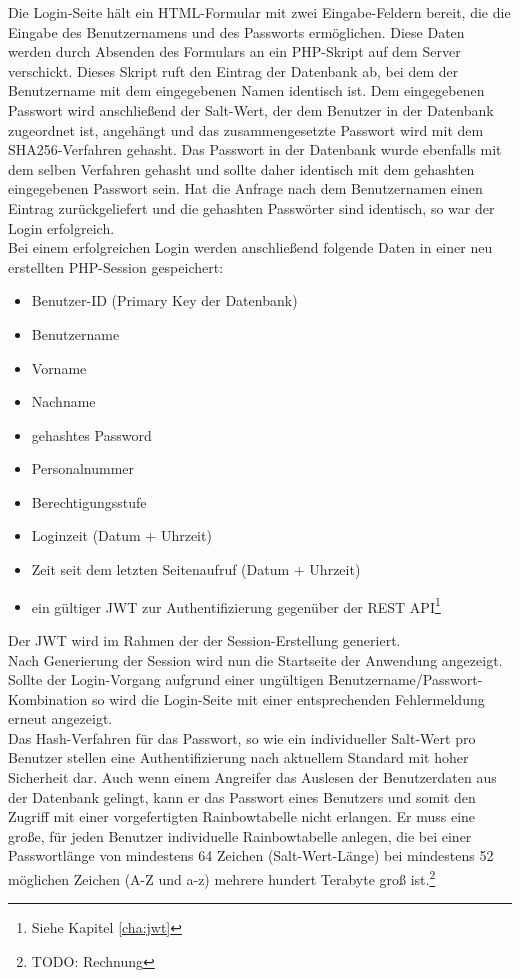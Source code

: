 Die Login-Seite hält ein \ac{HTML}-Formular mit zwei Eingabe-Feldern bereit, die die Eingabe des Benutzernamens und des Passworts ermöglichen. Diese Daten werden durch Absenden des Formulars an ein \ac{PHP}-Skript auf dem Server verschickt. Dieses Skript ruft den Eintrag der Datenbank ab, bei dem der Benutzername mit dem eingegebenen Namen identisch ist. Dem eingegebenen Passwort wird anschließend der Salt-Wert, der dem Benutzer in der Datenbank zugeordnet ist, angehängt und das zusammengesetzte Passwort wird mit dem SHA256-Verfahren gehasht. Das Passwort in der Datenbank wurde ebenfalls mit dem selben Verfahren gehasht und sollte daher identisch mit dem gehashten eingegebenen Passwort sein. Hat die Anfrage nach dem Benutzernamen einen Eintrag zurückgeliefert und die gehashten Passwörter sind identisch, so war der Login erfolgreich.\\
Bei einem erfolgreichen Login werden anschließend folgende Daten in einer neu erstellten \ac{PHP}-Session gespeichert:
\begin{itemize}
	\item Benutzer-ID (Primary Key der Datenbank)
	\item Benutzername
	\item Vorname
	\item Nachname
	\item gehashtes Password
	\item Personalnummer
	\item Berechtigungsstufe
	\item Loginzeit (Datum + Uhrzeit)
	\item Zeit seit dem letzten Seitenaufruf (Datum + Uhrzeit)
	\item ein gültiger \ac{JWT} zur Authentifizierung gegenüber der \ac{REST} \ac{API}\footnote{Siehe Kapitel \ref{cha:jwt} }
\end{itemize}
Der \ac{JWT} wird im Rahmen der der Session-Erstellung generiert.\\
Nach Generierung der Session wird nun die Startseite der Anwendung angezeigt.\\
Sollte der Login-Vorgang aufgrund einer ungültigen Benutzername/Passwort-Kombination so wird die Login-Seite mit einer entsprechenden Fehlermeldung erneut angezeigt.\\

Das Hash-Verfahren für das Passwort, so wie ein individueller Salt-Wert pro Benutzer stellen eine Authentifizierung nach aktuellem Standard mit hoher Sicherheit dar. Auch wenn einem Angreifer das Auslesen der Benutzerdaten aus der Datenbank gelingt, kann er das Passwort eines Benutzers und somit den Zugriff mit einer vorgefertigten Rainbowtabelle nicht erlangen. Er muss eine große, für jeden Benutzer individuelle Rainbowtabelle anlegen, die bei einer Passwortlänge von mindestens 64 Zeichen (Salt-Wert-Länge) bei mindestens 52 möglichen Zeichen (A-Z und a-z) mehrere hundert Terabyte groß ist.\footnote{TODO: Rechnung}\\

